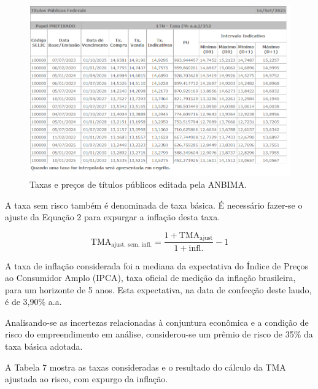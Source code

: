 \documentclass[
  10pt,
  a4paper]{article}
\begin{document}
\begin{figure}[H]

{\centering \includegraphics[width=0.7\linewidth]{ANBIMA} 

}

\caption{Taxas e preços de títulos públicos editada pela ANBIMA.}\label{fig:ANBIMA}
\end{figure}

A taxa sem risco também é denominada de taxa básica. É necessário
fazer-se o ajuste da Equação 2 para expurgar a inflação desta taxa.

\begin{equation}
\text{TMA}_{\text{ajust. sem. infl.}} = \frac{1+\text{TMA}_{\text{ajust}}}{1+\text{infl.}}-1
\end{equation}

A taxa de inflação considerada foi a mediana da expectativa do Índice de
Preços ao Consumidor Amplo (IPCA), taxa oficial de medição da inflação
brasileira, para um horizonte de 5 anos. Esta expectativa, na data de
confecção deste laudo, é de 3,90\% a.a.

Analisando-se as incertezas relacionadas à conjuntura econômica e a
condição de risco do empreendimento em análise, considerou-se um prêmio
de risco de 35\% da taxa básica adotada.

A Tabela 7 mostra as taxas consideradas e o resultado do cálculo da TMA
ajustada ao risco, com expurgo da inflação.
\end{document}
